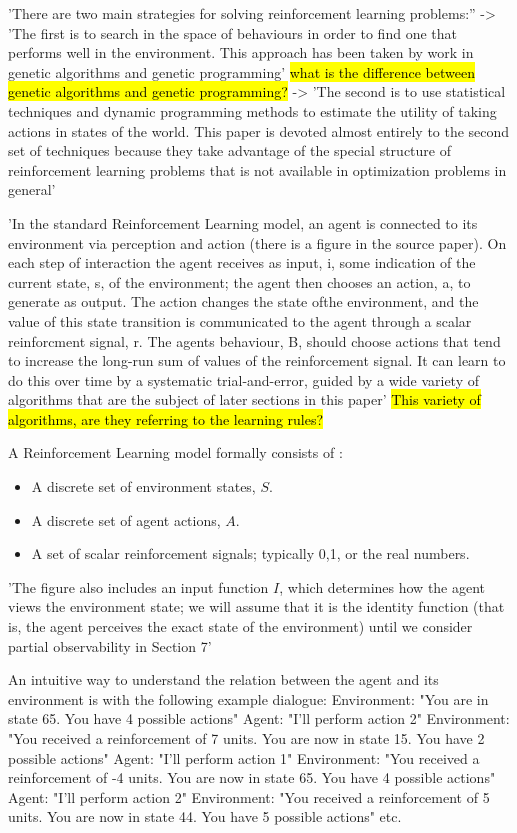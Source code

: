'There are two main strategies for solving reinforcement learning problems:''
-> 'The first is to search in the space of behaviours in order to find one that performs well in the environment. This approach has been taken by work in genetic algorithms and genetic programming'  \hl{what is the difference between genetic algorithms and genetic programming?}
-> 'The second is to use statistical techniques and dynamic programming methods to estimate the utility of taking actions in states of the world. This paper is devoted almost entirely to the second set of techniques because they take advantage of the special structure of reinforcement learning problems that is not available in optimization problems in general' \cite{KaelblingLittmanMoore1996}

'In the standard Reinforcement Learning model, an agent is connected to its environment via perception and action (there is a figure in the source paper). On each step of interaction the agent receives as input, i, some indication of the current state, s, of the environment; the agent then chooses an action, a, to generate as output. The action changes the state ofthe environment, and the value of this state transition is communicated to the agent through a scalar reinforcment signal, r. The agents behaviour, B, should choose actions that tend to increase the long-run sum of values of the reinforcement signal. It can learn to do this over time by a systematic trial-and-error, guided by a wide variety of algorithms that are the subject of later sections in this paper'
\hl{This variety of algorithms, are they referring to the learning rules?}

A Reinforcement Learning model formally consists of \cite{KaelblingLittmanMoore1996}:
\begin{itemize}
	\item A discrete set of environment states, $S$.
	\item A discrete set of agent actions, $A$.
	\item A set of scalar reinforcement signals; typically {0,1}, or the real numbers.
\end{itemize}

'The figure also includes an input function $I$, which determines how the agent views the environment state; we will assume that it is the identity function (that is, the agent perceives the exact state of the environment) until we consider partial observability in Section 7' \cite{KaelblingLittmanMoore1996}

An intuitive way to understand the relation between the agent and its environment is with the following example dialogue:
Environment: "You are in state 65. You have 4 possible actions"
Agent: "I'll perform action 2"
Environment: "You received a reinforcement of 7 units. You are now in state 15. You have 2 possible actions"
Agent: "I'll perform action 1"
Environment: "You received a reinforcement of -4 units. You are now in state 65. You have 4 possible actions"
Agent: "I'll perform action 2"
Environment: "You received a reinforcement of 5 units. You are now in state 44. You have 5 possible actions"
etc.

